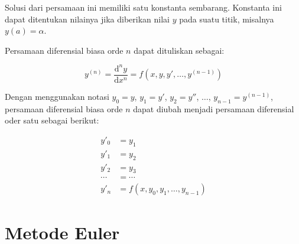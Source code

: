 \documentclass[11pt]{article}
\begin{document}
Solusi dari persamaan ini memiliki satu konstanta sembarang. Konstanta
ini dapat ditentukan nilainya jika diberikan nilai \(y\) pada suatu
titik, misalnya \(y(a) = \alpha\).

Persamaan diferensial biasa orde \(n\) dapat dituliskan sebagai:

\[
y^{(n)} = \frac{\mathrm{d}^n y}{\mathrm{d}x^n} = f\left(x,y,y',\ldots,y^{(n-1)}\right)
\]

Dengan menggunakan notasi \(y_0 = y\), \(y_1 = y'\), \(y_2 = y''\),
\(\ldots\), \(y_{n-1} = y^{(n-1)}\), persamaan diferensial biasa orde
\(n\) dapat diubah menjadi persamaan diferensial oder satu sebagai
berikut:

\[
\begin{align*}
y'_{0} &= y_{1} \\
y'_{1} &= y_{2} \\
y'_{2} &= y_{3} \\
\cdots & = \cdots \\
y'_{n} &= f\left(x,y_{0},y_{1},\ldots,y_{n-1}\right)
\end{align*}
\]

    \hypertarget{metode-euler}{%
\section{Metode Euler}\label{metode-euler}}
\end{document}
